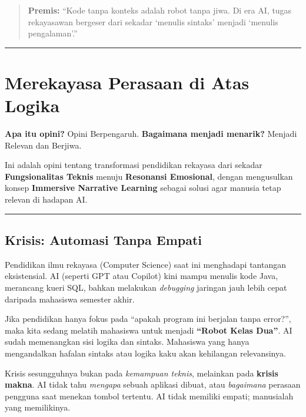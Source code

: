 \documentclass[
  letterpaper,
  DIV=11,
  numbers=noendperiod]{scrreprt}
\begin{document}
\begin{quote}
\textbf{Premis:} ``Kode tanpa konteks adalah robot tanpa jiwa. Di era
AI, tugas rekayasawan bergeser dari sekadar `menulis sintaks' menjadi
`menulis pengalaman'.''
\end{quote}

\begin{center}\rule{0.5\linewidth}{0.5pt}\end{center}

\section{Merekayasa Perasaan di Atas
Logika}\label{merekayasa-perasaan-di-atas-logika}

\textbf{Apa itu opini?} Opini Berpengaruh. \textbf{Bagaimana menjadi
menarik?} Menjadi Relevan dan Berjiwa.

Ini adalah opini tentang transformasi pendidikan rekayasa dari sekadar
\textbf{Fungsionalitas Teknis} menuju \textbf{Resonansi Emosional},
dengan mengusulkan konsep \textbf{Immersive Narrative Learning} sebagai
solusi agar manusia tetap relevan di hadapan AI.

\begin{center}\rule{0.5\linewidth}{0.5pt}\end{center}

\subsection{Krisis: Automasi Tanpa
Empati}\label{krisis-automasi-tanpa-empati}

Pendidikan ilmu rekayasa (Computer Science) saat ini menghadapi
tantangan eksistensial. AI (seperti GPT atau Copilot) kini mampu menulis
kode Java, merancang kueri SQL, bahkan melakukan \emph{debugging}
jaringan jauh lebih cepat daripada mahasiswa semester akhir.

Jika pendidikan hanya fokus pada ``apakah program ini berjalan tanpa
error?'', maka kita sedang melatih mahasiswa untuk menjadi
\textbf{``Robot Kelas Dua''}. AI sudah memenangkan sisi logika dan
sintaks. Mahasiswa yang hanya mengandalkan hafalan sintaks atau logika
kaku akan kehilangan relevansinya.

Krisis sesungguhnya bukan pada \emph{kemampuan teknis}, melainkan pada
\textbf{krisis makna}. AI tidak tahu \emph{mengapa} sebuah aplikasi
dibuat, atau \emph{bagaimana} perasaan pengguna saat menekan tombol
tertentu. AI tidak memiliki empati; manusialah yang memilikinya.
\end{document}
